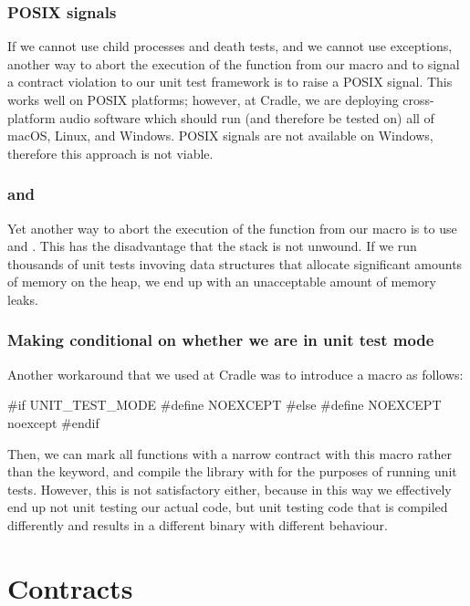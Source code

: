 \subsubsection{POSIX signals}

If we cannot use child processes and death tests, and we cannot use exceptions, another way to abort the execution of the function from our  macro and to signal a contract violation to our unit test framework is to raise a POSIX signal. This works well on POSIX platforms; however, at Cradle, we are deploying cross-platform audio software which should run (and therefore be tested on) all of macOS, Linux, and Windows. POSIX signals are not available on Windows, therefore this approach is not viable.

\subsubsection{ and }

Yet another way to abort the execution of the function from our  macro is to use  and . This has the disadvantage that the stack is not unwound. If we run thousands of unit tests invoving data structures that allocate significant amounts of memory on the heap, we end up with an unacceptable amount of memory leaks.

\subsubsection{Making  conditional on whether we are in unit test mode}

Another workaround that we used at Cradle was to introduce a macro as follows:
\begin{codeblock}
#if UNIT_TEST_MODE
  #define NOEXCEPT 
#else
  #define NOEXCEPT noexcept
#endif
\end{codeblock}
Then, we can mark all functions with a narrow contract with this  macro rather than the  keyword, and compile the library with  for the purposes of running unit tests. However, this is not satisfactory either, because in this way we effectively end up not unit testing our actual code, but unit testing code that is compiled differently and results in a different binary with different behaviour.

\section{Contracts}
\label{sec:contracts}

